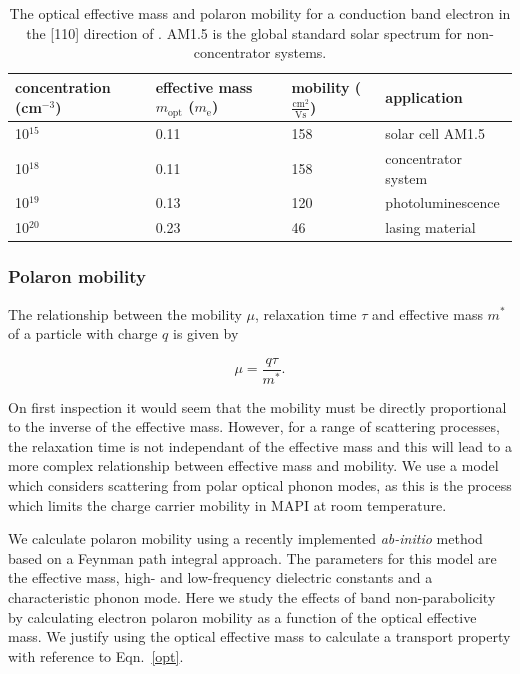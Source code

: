 \begin{table} \centering
\caption[Electron effective mass and polaron mobility at various carrier concentrations]{\label{masstable} The optical effective mass and polaron mobility for a conduction band electron in the [110] direction of . AM1.5 is the global standard solar spectrum for non-concentrator systems.}
\begin{tabular}{p{3cm}p{3cm}p{3cm}p{5cm}}
\toprule
concentration (cm$^{-3}$) & effective mass $m_\text{opt}$ ($m_\text{e}$) & mobility ($\frac{\text{cm}^2}{\text{Vs}}$) & application \\
\midrule
10$^{15}$ & 0.11 & 158 & solar cell AM1.5\\
10$^{18}$ & 0.11 & 158 & concentrator system \\
10$^{19}$ & 0.13 & 120 & photoluminescence\\
10$^{20}$ & 0.23 & 46 & lasing material \\
\bottomrule
\end{tabular}
\end{table}


\subsubsection{Polaron mobility}

The relationship between the mobility $\mu$, relaxation time $\tau$ and effective mass $m^*$ of a particle with charge $q$ is given by

\begin{equation}
\mu = \frac{q\tau}{m^*}.
\end{equation}

On first inspection it would seem that the mobility must be directly proportional to the inverse of the effective mass. 
However, for a range of scattering processes, the relaxation time is not independant of the effective mass and this will lead to a more complex relationship between effective mass and mobility.
We use a model which considers scattering from polar optical phonon modes,
as this is the process which limits the charge carrier mobility in MAPI at room temperature.\autocite{Wright2016}

We calculate polaron mobility using a recently implemented \textit{ab-initio} method based on a Feynman path integral approach.\autocite{Frost2017b}
The parameters for this model are the effective mass, high- and low-frequency dielectric constants and a characteristic phonon mode.
Here we study the effects of band non-parabolicity by calculating electron polaron mobility as a function of the optical effective mass. 
We justify using the optical effective mass to calculate a transport property with reference to Eqn.\ \ref{opt}.

